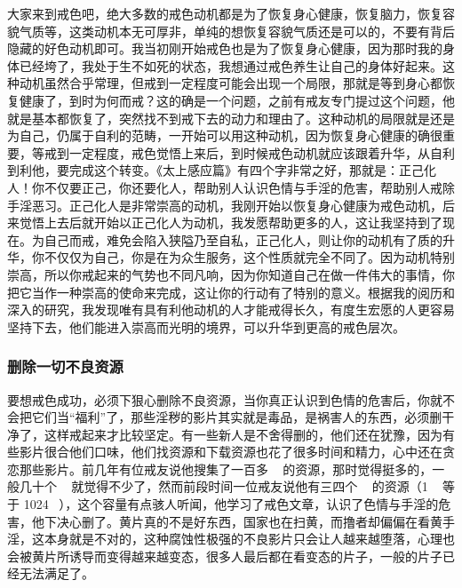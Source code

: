 大家来到戒色吧，绝大多数的戒色动机都是为了恢复身心健康，恢复脑力，恢复容貌气质等，这类动机本无可厚非，单纯的想恢复容貌气质还是可以的，不要有背后隐藏的好色动机即可。我当初刚开始戒色也是为了恢复身心健康，因为那时我的身体已经垮了，我处于生不如死的状态，我想通过戒色养生让自己的身体好起来。这种动机虽然合乎常理，但戒到一定程度可能会出现一个局限，那就是等到身心都恢复健康了，到时为何而戒？这的确是一个问题，之前有戒友专门提过这个问题，他就是基本都恢复了，突然找不到戒下去的动力和理由了。这种动机的局限就是还是为自己，仍属于自利的范畴，一开始可以用这种动机，因为恢复身心健康的确很重要，等戒到一定程度，戒色觉悟上来后，到时候戒色动机就应该跟着升华，从自利到利他，要完成这个转变。《太上感应篇》有四个字非常之好，那就是：正己化人！你不仅要正己，你还要化人，帮助别人认识色情与手淫的危害，帮助别人戒除手淫恶习。正己化人是非常崇高的动机，我刚开始以恢复身心健康为戒色动机，后来觉悟上去后就开始以正己化人为动机，我发愿帮助更多的人，这让我坚持到了现在。为自己而戒，难免会陷入狭隘乃至自私，正己化人，则让你的动机有了质的升华，你不仅仅为自己，你是在为众生服务，这个性质就完全不同了。因为动机特别崇高，所以你戒起来的气势也不同凡响，因为你知道自己在做一件伟大的事情，你把它当作一种崇高的使命来完成，这让你的行动有了特别的意义。根据我的阅历和深入的研究，我发现唯有具有利他动机的人才能戒得长久，有度生宏愿的人更容易坚持下去，他们能进入崇高而光明的境界，可以升华到更高的戒色层次。

\subsubsection{删除一切不良资源}

要想戒色成功，必须下狠心删除不良资源，当你真正认识到色情的危害后，你就不会把它们当“福利”了，那些淫秽的影片其实就是毒品，是祸害人的东西，必须删干净了，这样戒起来才比较坚定。有一些新人是不舍得删的，他们还在犹豫，因为有些影片很合他们口味，他们找资源和下载资源也花了很多时间和精力，心中还在贪恋那些影片。前几年有位戒友说他搜集了一百多 \unit{\giga\byte} 的资源，那时觉得挺多的，一般几十个 \unit{\giga\byte} 就觉得不少了，然而前段时间一位戒友说他有三四个 \unit{\tera\byte} 的资源（1 \unit{\tera\byte} 等于 1024 \unit{\giga\byte}），这个容量有点骇人听闻，他学习了戒色文章，认识了色情与手淫的危害，他下决心删了。黄片真的不是好东西，国家也在扫黄，而撸者却偏偏在看黄手淫，这本身就是不对的，这种腐蚀性极强的不良影片只会让人越来越堕落，心理也会被黄片所诱导而变得越来越变态，很多人最后都在看变态的片子，一般的片子已经无法满足了。

